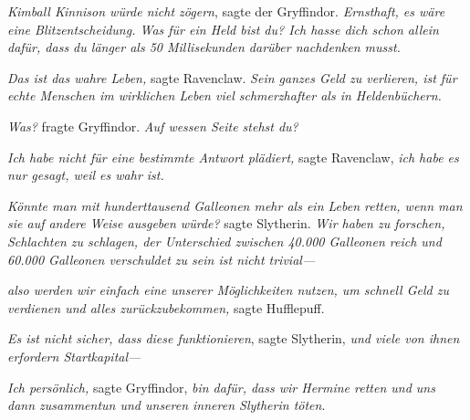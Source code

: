 \emph{Kimball Kinnison würde nicht zögern}, sagte der Gryffindor. \emph{Ernsthaft, es wäre eine Blitzentscheidung. Was für ein Held bist du? Ich hasse dich schon allein dafür, dass du länger als 50 Millisekunden darüber nachdenken musst.}

\emph{Das ist das wahre Leben,} sagte Ravenclaw. \emph{Sein ganzes Geld zu verlieren, ist für echte Menschen im wirklichen Leben viel schmerzhafter als in Heldenbüchern.}

\emph{Was?} fragte Gryffindor. \emph{Auf wessen Seite stehst du?}

\emph{Ich habe nicht für eine bestimmte Antwort plädiert,} sagte Ravenclaw, \emph{ich habe es nur gesagt, weil es wahr ist.}

\emph{Könnte man mit hunderttausend Galleonen mehr als ein Leben retten, wenn man sie auf andere Weise ausgeben würde?} sagte Slytherin. \emph{Wir haben zu forschen, Schlachten zu schlagen, der Unterschied zwischen 40.000 Galleonen reich und 60.000 Galleonen verschuldet zu sein ist nicht trivial—}

\emph{also werden wir einfach eine unserer Möglichkeiten nutzen, um schnell Geld zu verdienen und alles zurückzubekommen,} sagte Hufflepuff.

\emph{Es ist nicht sicher, dass diese funktionieren}, sagte Slytherin, \emph{und viele von ihnen erfordern Startkapital—}

\emph{Ich persönlich,} sagte Gryffindor, \emph{bin dafür, dass wir Hermine retten und uns dann zusammentun und unseren inneren Slytherin töten}.

